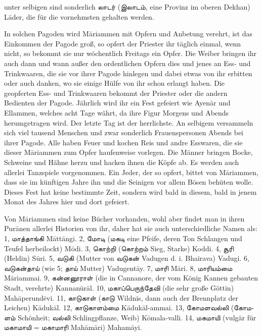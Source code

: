 \documentclass{article}
\newcommand{\TamilText}[1]{\texttamil{#1}}
\newcommand{\tam}[1]{\TamilText{#1}}
\begin{document}
unter selbigen sind sonderlich \tam{லாடர்} (\tam{இலாடம்}, eine Provinz im oberen Dekhan) L\={a}der, die für die vornehmsten gehalten werden.

In solchen Pagoden wird M\={a}riammen mit Opfern und Anbetung verehrt, ist das Einkommen der Pagode groß, so opfert der Priester ihr täglich einmal, wenn nicht, so bekommt sie nur wöchentlich Freitags ein Opfer. Die Weiber bringen ihr auch dann und wann außer den ordentlichen Opfern dies und jenes an Ess- und Trinkwaaren, die sie vor ihrer Pagode hinlegen und dabei etwas von ihr erbitten oder auch danken, wo sie einige Hülfe von ihr schon erlangt haben. Die geopferten Ess- und Trinkwaaren bekommt der Priester oder die andern Bedienten der Pagode. Jährlich wird ihr ein Fest gefeiert wie Ayen\={a}r und Ellammen, welches acht Tage währt, da ihre Figur Morgens und Abends herumgetragen wird. Der letzte Tag ist der herrlichste. An selbigem versammeln sich viel tausend Menschen und zwar sonderlich Frauenspersonen Abends bei ihrer Pagode. Alle haben Feuer und kochen Reis und andre Esswaren, die sie dieser M\={a}riammen zum Opfer haufenweise vorlegen. Die Männer bringen Bocke, Schweine und Hähne herzu und hacken ihnen die Köpfe ab. Es werden auch allerlei Tanzspiele vorgenommen. Ein Jeder, der so opfert, bittet von M\={a}riammen, dass sie im künftigen Jahre ihn und die Seinigen vor allem Bösen behüten wolle. Dieses Fest hat keine bestimmte Zeit, sondern wird bald in diesem, bald in jenem Monat des Jahres hier und dort gefeiert.

Von M\={a}riammen sind keine Bücher vorhanden, wohl aber findet man in ihren Pur\={a}nen allerlei Historien von ihr, daher hat sie auch unterschiedliche Namen als: 1, \tam{மாத்தாங்கி} M\={a}tt\={a}ngi. 2, \tam{மோடி} (\tam{மகடி} eine Pfeife, deren Ton Schlangen und Teufel herbeilockt) M\={o}di. 3, \tam{கொற்றி} (\tam{கொற்றம்} Sieg, Starke) Koddi. 4, \tam{சூரி} (Heldin) S\={u}ri. 5, \tam{வடுகி} (Mutter von \tam{வடுகன்} Vadugen d. i. Bhairava) Vadugi. 6, \tam{வடுகன்தாய்} (wie 5; \tam{தாய்} Mutter) Vadugent\={a}y. 7, \tam{மாரி} M\={a}ri. 8, \tam{மாரியம்மை} M\={a}riammai. 9, \tam{கன்னனூராள்} (die in Cannanore, der vom König Kannen gebauten Stadt, verehrte) Kannan\={u}r\={a}l. 10, \tam{மகாப்பெருந்தேவி} (die sehr große Göttin) Mah\={a}perund\={e}vi. 11, \tam{காடுகாள்} (\tam{காடு} Wildnis, dann auch der Brennplatz der Leichen) K\={a}duk\={a}l. 12, \tam{காடுகாளம்மை} K\={a}duk\={a}l-ammai. 13, \tam{கோமளவல்லி} (\tam{கோமளம்} Schönheit; \tam{வல்லி} Schlingpflanze, Weib) K\={o}mala-valli. 14, \tam{மகமாயி} (vulgär für \tam{மகாமாயி} = \tam{மகாமாரி} Mah\={a}m\={a}ri) Maham\={a}yi.
\end{document}
